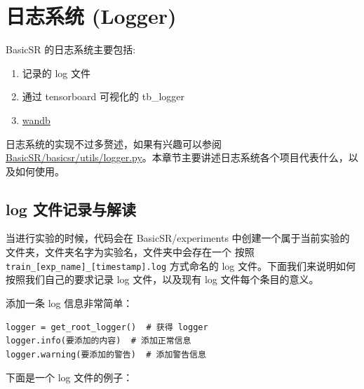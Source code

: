 \documentclass[../main.tex]{subfiles}
\begin{document}
\section{日志系统 (Logger)}\label{code_structure:logger}

BasicSR 的日志系统主要包括:

\begin{enumerate}
    \item 记录的 log 文件
    \item 通过 tensorboard 可视化的 tb\_logger
    \item \href{https://wandb.ai/}{wandb}
\end{enumerate}

日志系统的实现不过多赘述，如果有兴趣可以参阅 \href{https://github.com/XPixelGroup/BasicSR/blob/master/basicsr/utils/logger.py}{BasicSR/basicsr/utils/logger.py}。本章节主要讲述日志系统各个项目代表什么，以及如何使用。

\subsection{log 文件记录与解读}\label{code_structure:log_record}

当进行实验的时候，代码会在 BasicSR/experiments 中创建一个属于当前实验的文件夹，文件夹名字为实验名，文件夹中会存在一个 按照 \texttt{train\_[exp\_name]\_[timestamp].log} 方式命名的 log 文件。下面我们来说明如何按照我们自己的要求记录 log 文件，以及现有 log 文件每个条目的意义。

\begin{hl} %

    添加一条 log 信息非常简单：

\begin{verbatim}
logger = get_root_logger()  # 获得 logger
logger.info(要添加的内容)  # 添加正常信息
logger.warning(要添加的警告)  # 添加警告信息
\end{verbatim}
\end{hl}

下面是一个 log 文件的例子：
\end{document}
